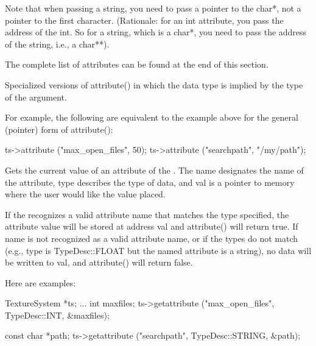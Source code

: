 Note that when passing a string, you need to pass a pointer to the {\cf
  char*}, not a pointer to the first character.  (Rationale: for an {\cf
  int} attribute, you pass the address of the {\cf int}.  So for a
string, which is a {\cf char*}, you need to pass the address of the
string, i.e., a {\cf char**}).

The complete list of attributes can be found at the end of this section.

\apiend

Specialized versions of {\cf attribute()} in which the data type is
implied by the type of the argument.

For example, the following are equivalent to the example above for the
general (pointer) form of {\cf attribute()}:

\begin{code}
      ts->attribute ("max_open_files", 50);
      ts->attribute ("searchpath", "/my/path");
\end{code}

\apiend



Gets the current value of an attribute of the \TextureSystem.
The {\cf name} designates the name of the attribute, {\cf type}
describes the type of data, and {\cf val} is a pointer to memory 
where the user would like the value placed.

If the \TextureSystem recognizes a valid attribute name that matches the
type specified, the attribute value will be stored at address {\cf val}
and {\cf attribute()} will return {\cf true}.  If {\cf name} is not recognized
as a valid attribute name, or if the types do not match (e.g., {\cf
  type} is {\cf TypeDesc::FLOAT} but the named attribute is a string),
no data will be written to {\cf val}, and {\cf attribute()} will return
{\cf false}.

Here are examples:

\begin{code}
      TextureSystem *ts; 
      ...
      int maxfiles;
      ts->getattribute ("max_open_files", TypeDesc::INT, &maxfiles);

      const char *path;
      ts->getattribute ("searchpath", TypeDesc::STRING, &path);
\end{code}

